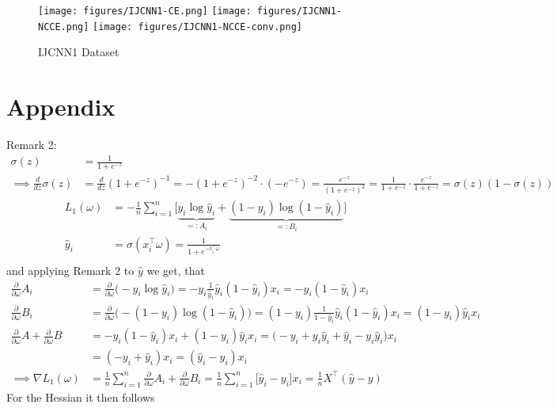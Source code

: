 \documentclass{article}
\begin{document}
\begin{figure}
    \centering
    \caption{IJCNN1 Dataset}
    \texttt{[image: figures/IJCNN1-CE.png]}
    \texttt{[image: figures/IJCNN1-NCCE.png]}
    \texttt{[image: figures/IJCNN1-NCCE-conv.png]}
\end{figure}
\newpage
\section{Appendix}
Remark 2:
\begin{align*}
  \sigma(z) &= \frac{1}{1 + e^{-z}} \\
  \implies \frac{d}{dz} \sigma(z) &= \frac{d}{dz} (1 + e^{-z})^{-1}
  = -(1 + e^{-z})^{-2} \cdot (-e^{-z}) = \frac{e^{-z}}{(1 + e^{-z})^2}
  = \frac{1}{1 + e^{-z}} \cdot \frac{e^{-z}}{1 + e^{-z}}
  = \sigma(z) (1 - \sigma(z))
\end{align*}
\begin{align*}
L_1(\omega) &= -\frac{1}{n} \sum_{i=1}^n \Big[\underbrace{y_i \log \hat{y}_i}_{=:A_i} + \underbrace{(1 - y_i) \log (1 - \hat{y}_i)}_{=:B_i}\Big] \\
\hat{y}_i &= \sigma(x_i^\top \omega) = \frac{1}{1 + e^{-x_i^\top \omega}} \\
\end{align*}
and applying Remark 2 to $\hat{y}$ we get, that
\begin{align*}
\frac{\partial}{\partial \omega} A_i &= \frac{\partial}{\partial \omega}\big(-y_i \log \hat{y}_i\big) = -y_i \frac{1}{\hat{y}_i} \hat{y}_i (1 - \hat{y}_i) x_i = -y_i (1 - \hat{y}_i) x_i \\
%
\frac{\partial}{\partial \omega} B_i &=\frac{\partial}{\partial \omega} \big(-(1 - y_i) \log (1 - \hat{y}_i)\big) = (1 - y_i) \frac{1}{1 - \hat{y}_i} \hat{y}_i (1 - \hat{y}_i) x_i = (1 - y_i) \hat{y}_i x_i\\
%
\frac{\partial}{\partial \omega} A+\frac{\partial}{\partial \omega} B &= -y_i (1 - \hat{y}_i) x_i + (1 - y_i) \hat{y}_i x_i 
= \big(-y_i + y_i \hat{y}_i + \hat{y}_i - y_i \hat{y}_i \big) x_i\\
&= (-y_i + \hat{y}_i) x_i = (\hat{y}_i-y_i ) x_i\\
%
\implies \nabla L_1(\omega) &= \frac{1}{n} \sum_{i=1}^n \frac{\partial}{\partial \omega} A_i+\frac{\partial}{\partial \omega} B_i
= \frac{1}{n} \sum_{i=1}^n \big[\hat{y}_i - y_i\big] x_i = \frac{1}{n} X^\top (\hat{y} - y)
\end{align*}
For the Hessian it then follows
\end{document}
